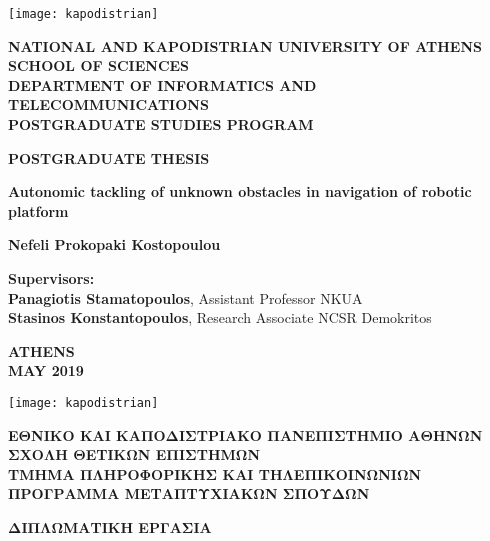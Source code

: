 \begin{titlepage}
	\begin{center}
		\texttt{[image: kapodistrian]}

		\large
		\textbf{NATIONAL AND KAPODISTRIAN UNIVERSITY OF ATHENS}\\
		\vspace{0.2cm}
		\normalsize
		\textbf{SCHOOL OF SCIENCES}\\
		\vspace{0.2cm}
		\textbf{DEPARTMENT OF INFORMATICS AND TELECOMMUNICATIONS}\\
		\vspace{0.2cm}
		\textbf{POSTGRADUATE STUDIES PROGRAM}
		
		\vspace{1.5cm}
		\textbf{POSTGRADUATE THESIS}
		
		\vspace{1.5cm}
		\Large
		\textbf{Autonomic tackling of unknown obstacles in navigation of robotic platform}
		
		\vspace{1.5cm}
		\normalsize
		\textbf{Nefeli Prokopaki Kostopoulou}
		
		\vspace{1.5cm}
		\textbf{Supervisors:}\\
		\textbf{Panagiotis Stamatopoulos}, Assistant Professor NKUA\\
		\textbf{Stasinos Konstantopoulos}, Research Associate NCSR Demokritos
		
		\vfill
		
		\vspace{0.8cm}
		\textbf{ATHENS}\\
		\textbf{MAY 2019}
		\thispagestyle{empty}
		\newpage
		
		
		\texttt{[image: kapodistrian]}
		
		\large
		\textbf{ΕΘΝΙΚΟ ΚΑΙ ΚΑΠΟΔΙΣΤΡΙΑΚΟ ΠΑΝΕΠΙΣΤΗΜΙΟ ΑΘΗΝΩΝ}\\
		\vspace{0.2cm}
		\normalsize
		\textbf{ΣΧΟΛΗ ΘΕΤΙΚΩΝ ΕΠΙΣΤΗΜΩΝ}\\
		\vspace{0.2cm}
		\textbf{ΤΜΗΜΑ ΠΛΗΡΟΦΟΡΙΚΗΣ ΚΑΙ ΤΗΛΕΠΙΚΟΙΝΩΝΙΩΝ}\\
		\vspace{0.2cm}
		\textbf{ΠΡΟΓΡΑΜΜΑ ΜΕΤΑΠΤΥΧΙΑΚΩΝ ΣΠΟΥΔΩΝ}
		
		\vspace{1.5cm}
		\textbf{ΔΙΠΛΩΜΑΤΙΚΗ ΕΡΓΑΣΙΑ}
		

\end{center}
\end{titlepage}
